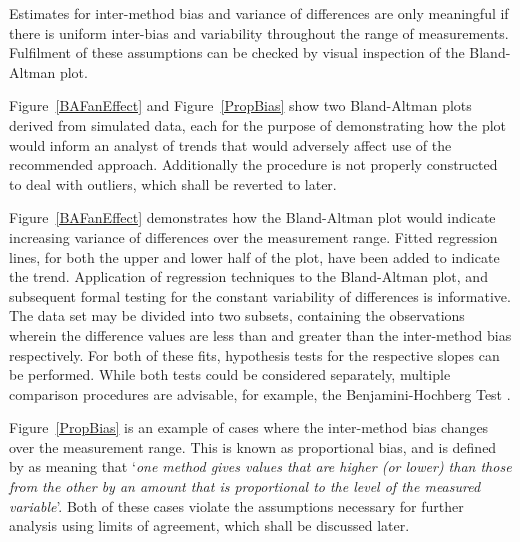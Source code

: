 \documentclass[12pt, a4paper]{report}
\theoremstyle{plain}
\theoremstyle{definition}
\theoremstyle{remark}
\begin{document}
Estimates for inter-method bias and variance of differences are only meaningful if there is uniform inter-bias and variability throughout the range of measurements. Fulfilment of these assumptions can be checked by visual inspection of the Bland-Altman plot.

	
Figure~\ref{BAFanEffect} and Figure~\ref{PropBias} show two Bland-Altman plots derived from
	simulated data, each for the purpose of demonstrating how the plot would inform an analyst of trends that would adversely affect use of the recommended approach. Additionally the procedure is not properly constructed to deal with outliers, which  shall be reverted to later.
	
Figure~\ref{BAFanEffect} demonstrates how the Bland-Altman plot would indicate
	increasing variance of differences over the measurement range.
	Fitted regression lines, for both the upper and lower half of the	plot, have  been added to indicate the trend. Application of regression techniques to the Bland-Altman plot, and subsequent formal testing for the constant variability of differences is informative. The data set may be divided into two subsets, containing the observations wherein the difference values are less than and greater than the inter-method bias respectively. For both of these fits, hypothesis tests for the respective slopes can be performed. While both tests could be considered separately, multiple comparison procedures are advisable, for example, the Benjamini-Hochberg Test \citep{BH}.
	
Figure~\ref{PropBias} is an example
	of cases where the inter-method bias changes over the measurement range. This is known as proportional bias, and is defined by \citet{ludbrook97} as meaning that `\textit{one method gives
	values that are higher (or lower) than those from the other by an
	amount that is proportional to the level of the measured variable}'. Both of these cases violate the assumptions necessary for further analysis using limits of agreement, which shall be discussed later. 
	
\end{document}
